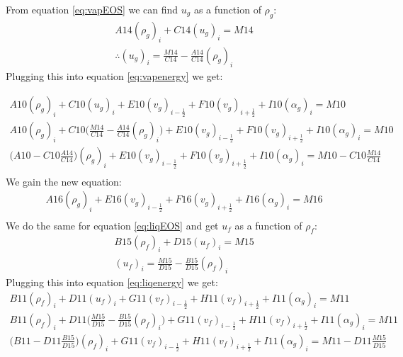 \documentclass[11pt,letterpaper,titlepage]{article}
\newcommand{\half}{\frac{1}{2}}
\begin{document}
\noindent
From equation \ref{eq:vapEOS} we can find $u_g$ as a function of $\rho_g$:
\begin{equation*}
\begin{aligned}
A14 (\rho_g)_i+ C14(u_g)_i=M14 \\ 
\therefore (u_g)_i = \frac{M14}{C14} - \frac{A14}{C14} (\rho_g)_i 
\end{aligned}
\end{equation*}
\newline
\noindent Plugging this into equation \ref{eq:vapenergy} we get:

\begin{equation*}
\begin{aligned}
A10 (\rho_g)_i + C10 (u_g)_i + E10  (v_g)_{i-\half}  + F10  (v_g)_{i+\half}+ I10 (\alpha_g)_i=M10 \\ 
A10 (\rho_g)_i + C10 \biggr(  \frac{M14}{C14} - \frac{A14}{C14} (\rho_g)_i \biggr) + E10  (v_g)_{i-\half}  + F10  (v_g)_{i+\half}+ I10 (\alpha_g)_i=M10 \\ 
\biggr(A10 - C10 \frac{A14}{C14}  \biggr)(\rho_g)_i + E10  (v_g)_{i-\half}  + F10  (v_g)_{i+\half}+ I10 (\alpha_g)_i=M10 -C10\frac{M14}{C14} \\
\end{aligned}
\end{equation*}
\newline
\noindent We gain the new equation:
\begin{equation} \label{eq:ug-elim}
\begin{aligned}
A16(\rho_g)_i + E16  (v_g)_{i-\half}  + F16  (v_g)_{i+\half}+ I16 (\alpha_g)_i=M16\\
\end{aligned}
\end{equation}
\newline
\noindent
We do the same for equation \ref{eq:liqEOS} and get $u_f$ as a function of $\rho_f$:
\begin{equation*}
\begin{aligned}
B15 (\rho_f)_i + D15 (u_f)_i=M15 \\
(u_f)_i = \frac{M15}{D15} - \frac{B15}{D15}(\rho_f)_i
\end{aligned}
\end{equation*}
\newline
\noindent
Plugging this into equation \ref{eq:liqenergy} we get:
\begin{equation*}
\begin{aligned}
B11 (\rho_f)_i + D11 (u_f)_i + G11  (v_f)_{i-\half} + H11  (v_f)_{i+\half} + I11(\alpha_g)_i=M11 \\ 
B11 (\rho_f)_i + D11 \biggr( \frac{M15}{D15} - \frac{B15}{D15}(\rho_f)_i\biggr) + G11  (v_f)_{i-\half} + H11  (v_f)_{i+\half} + I11(\alpha_g)_i=M11 \\ 
\biggr( B11-D11\frac{B15}{D15} \biggr)(\rho_f)_i+ G11  (v_f)_{i-\half} + H11  (v_f)_{i+\half} + I11(\alpha_g)_i=M11 -D11\frac{M15}{D15}\\
\end{aligned}
\end{equation*}
\end{document}
